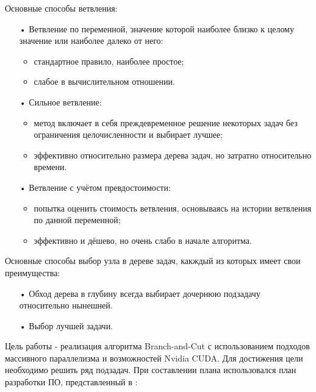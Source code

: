 \documentclass[a4paper,14pt,russian]{extreport}
\begin{document}
\par Основные способы ветвления:
  \begin{itemize}
  \item[•] Ветвление по переменной, значение которой наиболее близко к целому значение или наиболее далеко от него:
    \begin{itemize}
    \item стандартное правило, наиболее простое;
    \item слабое в вычислительном отношении. 
    \end{itemize}
  \item[•] Сильное ветвление:
    \begin{itemize} 
    \item метод включает в себя преждевременное решение некоторых задач без ограничения целочисленности и выбирает лучшее;
    \item эффективно относительно размера дерева задач, но затратно относительно времени.
    \end{itemize}
  \item[•] Ветвление с учётом превдостоимости:
    \begin{itemize}
    \item попытка оценить стоимость ветвления, основываясь на истории ветвления по данной переменной;
    \item эффективно и дёшево, но очень слабо в начале алгоритма.
    \end{itemize}
  \end{itemize}
\par Основные способы выбор узла в дереве задач, какждый из которых имеет свои преимущества:
  \begin{itemize}
  \item[•] Обход дерева в глубину \cite{dakin} всегда выбирает дочернюю подзадачу относительно нынешней.
  \item[•] Выбор лучшей задачи.
  \end{itemize}
\par Цель работы - реализация алгоритма Branch-and-Cut с использованием подходов массивного параллелизма и возможностей Nvidia CUDA. Для достижения цели необходимо решить ряд подзадач. При составлении плана использовался план разработки ПО, представленный в \cite{mcconnell}: 
\end{document}
